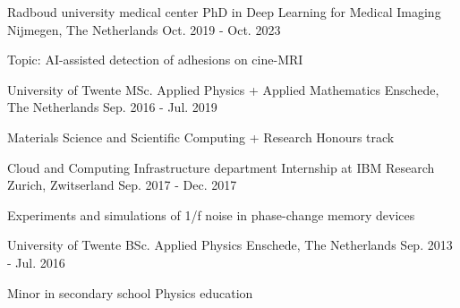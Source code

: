 

\begin{cventries}

  \cventry
    {Radboud university medical center} %
    {PhD in Deep Learning for Medical Imaging} %
    {Nijmegen, The Netherlands} %
    {Oct. 2019 - Oct. 2023} %
    {
      \begin{cvitems} %
        \item {Topic: AI-assisted detection of adhesions on cine-MRI}
      \end{cvitems}
    }

  \cventry
    {University of Twente} %
    {MSc. Applied Physics + Applied Mathematics} %
    {Enschede, The Netherlands} %
    {Sep. 2016 - Jul. 2019} %
    {
      \begin{cvitems} %
        \item {Materials Science and Scientific Computing + Research Honours track}
      \end{cvitems}
    }

  \cventry
    {Cloud and Computing Infrastructure department} %
    {Internship at IBM Research} %
    {Zurich, Zwitserland} %
    {Sep. 2017 - Dec. 2017} %
    {
      \begin{cvitems} %
        \item {Experiments and simulations of 1/f noise in phase-change memory devices}
      \end{cvitems}
    }

  \cventry
    {University of Twente} %
    {BSc. Applied Physics} %
    {Enschede, The Netherlands} %
    {Sep. 2013 - Jul. 2016} %
    {
      \begin{cvitems} %
        \item {Minor in secondary school Physics education}
      \end{cvitems}
    }

\end{cventries}
